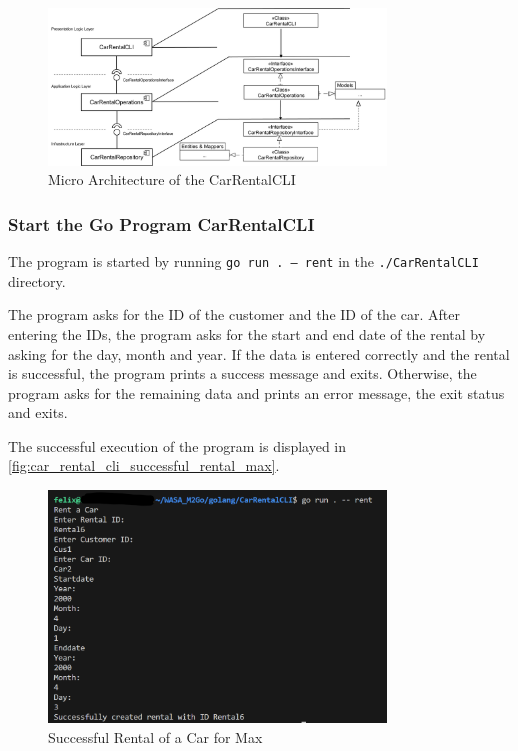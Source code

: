 \begin{figure}[h]
      \centering
      \includegraphics[width=0.8\textwidth]{figures/goLang/carRental/carRentalCLI/carRentalCLI_MicroArchitecture.png}
      \caption{Micro Architecture of the CarRentalCLI}
      \label{fig:car_rental_cli_micro_architecture}
\end{figure}

\subsubsection*{Start the Go Program CarRentalCLI}
The program is started by running \texttt{go run . --- rent} in the \texttt{./CarRentalCLI} directory.

The program asks for the ID of the customer and the ID of the car.
After entering the IDs, the program asks for the start and end date of the rental by asking for the day, month and year.
If the data is entered correctly and the rental is successful, the program prints a success message and exits.
Otherwise, the program asks for the remaining data and prints an error message, the exit status and exits.

The successful execution of the program is displayed in \autoref{fig:car_rental_cli_successful_rental_max}.

\begin{figure}
      \centering
      \includegraphics[width=0.8\textwidth]{figures/goLang/carRental/carRentalCLI/carRentalCli_SuccessfulRentalMax.png}
      \caption{Successful Rental of a Car for Max}
      \label{fig:car_rental_cli_successful_rental_max}
\end{figure}

